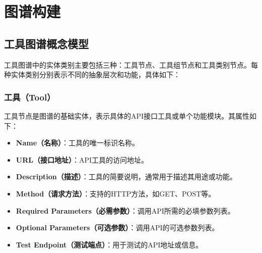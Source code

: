 




\section{图谱构建}

\subsection{工具图谱概念模型}

工具图谱中的实体类别主要包括三种：工具节点、工具组节点和工具类别节点。每种实体类别分别表示不同的抽象层次和功能，具体如下：

\subsubsection{工具（Tool）}
工具节点是图谱的基础实体，表示具体的API接口工具或单个功能模块。其属性如下：
\begin{itemize}
    \item \textbf{Name（名称）}：工具的唯一标识名称。
    \item \textbf{URL（接口地址）}：API工具的访问地址。
    \item \textbf{Description（描述）}：工具的简要说明，通常用于描述其用途或功能。
    \item \textbf{Method（请求方法）}：支持的HTTP方法，如GET、POST等。
    \item \textbf{Required Parameters（必需参数）}：调用API所需的必填参数列表。
    \item \textbf{Optional Parameters（可选参数）}：调用API的可选参数列表。
    \item \textbf{Test Endpoint（测试端点）}：用于测试的API地址或信息。
\end{itemize}

